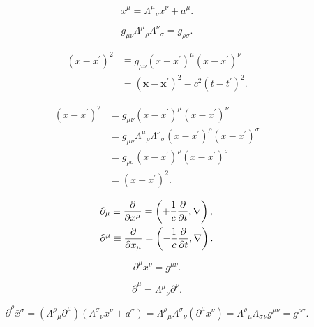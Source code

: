 \begin{equation}
	\bar{x}^\mu = \Lambda^{\mu}{}_\nu x^\nu + a^\mu.
\end{equation}

\begin{equation}
	g_{\mu\nu} \Lambda^\mu{}_\rho \Lambda^{\nu}{}_\sigma = g_{\rho\sigma}.
\end{equation}

\begin{equation}\begin{aligned}
	(x - x^\prime)^2 & \equiv g_{\mu\nu} (x - x^\prime)^\mu (x - x^\prime)^\nu \\
	& = (\mathbf{x} - \mathbf{x}^\prime)^2 - c^2 (t - t^\prime)^2.
\end{aligned}\end{equation}

\begin{equation}\begin{aligned}
	(\bar{x} - \bar{x}^\prime)^2 & = g_{\mu\nu} (\bar{x} - \bar{x}^\prime)^\mu (\bar{x} - \bar{x}^\prime)^\nu \\
	& = g_{\mu\nu} \Lambda^\mu{}_\rho \Lambda^\nu{}_\sigma (x - x^\prime)^\rho (x - x^\prime)^\sigma \\ 
	& = g_{\rho\sigma} (x - x^\prime)^\rho (x - x^\prime)^\sigma \\ 
	& = (x - x^\prime)^2.
\end{aligned}\end{equation}

\begin{align}
	& \partial_\mu \equiv \frac{\partial{}}{\partial{x^\mu}} = \left( + \frac{1}{c} \frac{\partial{}}{\partial{t}}, \nabla \right), \\
	& \partial^\mu \equiv \frac{\partial{}}{\partial{x_\mu}} = \left( - \frac{1}{c} \frac{\partial{}}{\partial{t}}, \nabla \right).
\end{align}

\begin{equation}
	\partial^\mu x^\nu = g^{\mu\nu}.
\end{equation}

\begin{equation}
	\bar\partial^\mu = \Lambda^\mu{}_\nu \partial^\nu.
\end{equation}

\begin{equation}
	\bar\partial^\rho \bar{x}^\sigma = (\Lambda^\rho{}_\mu \partial^\mu)(\Lambda^\sigma{}_\nu x^\nu + a^\sigma) = \Lambda^\rho{}_\mu \Lambda^\sigma{}_\nu (\partial^\mu x^\nu) = \Lambda^\rho{}_\mu \Lambda_\sigma{}_\nu g^{\mu\nu} = g^{\rho\sigma}.
\end{equation}

